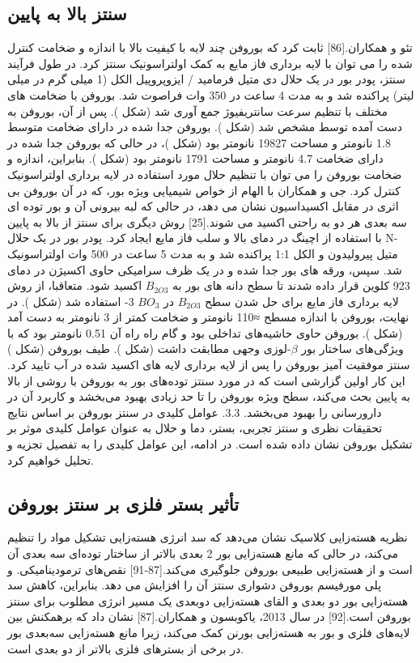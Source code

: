 \subsection{سنتز بالا به پایین}
تئو و همکاران.[86] ثابت کرد که بوروفن چند لایه با کیفیت بالا با اندازه و ضخامت کنترل شده را می توان با لایه برداری فاز مایع به کمک اولتراسونیک سنتز کرد. در طول فرآیند سنتز، پودر بور در یک حلال دی متیل فرمامید  / ایزوپروپیل الکل  (1 میلی گرم در میلی لیتر) پراکنده شد و به مدت 4 ساعت در 350 وات فراصوت شد. بوروفن با ضخامت های مختلف با تنظیم سرعت سانتریفیوژ جمع آوری شد (شکل ). پس از آن، بوروفن به دست آمده توسط  مشخص شد (شکل ). بوروفن جدا شده در  دارای ضخامت متوسط 1.8 نانومتر و مساحت 19827 نانومتر بود (شکل )، در حالی که بوروفن جدا شده در  دارای ضخامت 4.7 نانومتر و مساحت 1791 نانومتر بود (شکل ). بنابراین، اندازه و ضخامت بوروفن را می توان با تنظیم حلال مورد استفاده در لایه برداری اولتراسونیک کنترل کرد. جی و همکاران با الهام از خواص شیمیایی ویژه بور، که در آن بوروفن بی اثری در مقابل اکسیداسیون نشان می دهد، در حالی که لبه بیرونی آن و بور توده ای سه بعدی هر دو به راحتی اکسید می شوند.[25] روش دیگری برای سنتز از بالا به پایین با استفاده از اچینگ در دمای بالا و سلب فاز مایع ایجاد کرد. پودر بور در یک حلال N-متیل پیرولیدون  و الکل 1:1 پراکنده شد و به مدت 5 ساعت در 500 وات اولتراسونیک شد. سپس، ورقه های بور جدا شده و در یک ظرف سرامیکی حاوی اکسیژن در دمای 923 کلوین قرار داده شدند تا سطح دانه های بور به $B_{2O3}$ اکسید شود. متعاقبا، از روش لایه برداری فاز مایع برای حل شدن سطح $B_{2O3}$ در $BO_{3}$ 3- استفاده شد (شکل ). در نهایت، بوروفن با اندازه مسطح ≈110 نانومتر و ضخامت کمتر از 3 نانومتر به دست آمد (شکل ). بوروفن حاوی حاشیه‌های تداخلی بود و گام راه راه آن 0.51 نانومتر بود که با ویژگی‌های ساختار بور $\beta$-لوزی وجهی مطابقت داشت (شکل ). طیف  بوروفن (شکل ) سنتز موفقیت آمیز بوروفن را پس از لایه برداری لایه های اکسید شده در آب تایید کرد. این کار اولین گزارشی است که در مورد سنتز توده‌های بور به بوروفن با روشی از بالا به پایین بحث می‌کند، سطح ویژه بوروفن را تا حد زیادی بهبود می‌بخشد و کاربرد آن در دارورسانی را بهبود می‌بخشد. 3.3. عوامل کلیدی در سنتز بوروفن بر اساس نتایج تحقیقات نظری و سنتز تجربی، بستر، دما و حلال به عنوان عوامل کلیدی موثر بر تشکیل بوروفن نشان داده شده است. در ادامه، این عوامل کلیدی را به تفصیل تجزیه و تحلیل خواهیم کرد.
\subsection{تأثیر بستر فلزی بر سنتز بوروفن}
نظریه هسته‌زایی کلاسیک نشان می‌دهد که سد انرژی هسته‌زایی تشکیل مواد را تنظیم می‌کند، در حالی که مانع هسته‌زایی بور 2 بعدی بالاتر از ساختار توده‌ای سه بعدی آن است و از هسته‌زایی طبیعی بوروفن جلوگیری می‌کند.[87-91] نقص‌های ترمودینامیکی. و پلی مورفیسم بوروفن دشواری سنتز آن را افزایش می دهد. بنابراین، کاهش سد هسته‌زایی بور دو بعدی و القای هسته‌زایی دوبعدی یک مسیر انرژی مطلوب برای سنتز بوروفن است.[92] در سال 2013، یاکوبسون و همکاران.[87] نشان داد که برهمکنش بین لایه‌های فلزی و بور به هسته‌زایی بورنن کمک می‌کند، زیرا مانع هسته‌زایی سه‌بعدی بور در برخی از بسترهای فلزی بالاتر از دو بعدی است.

